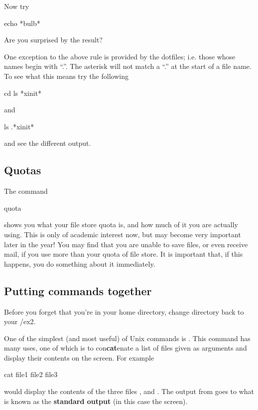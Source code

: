 Now try
%
\begin{ttoutenv}
  echo *bulb*\return
\end{ttoutenv}
%
Are you surprised by the result?

One exception to the above rule is provided by the dotfiles; i.e. those
whose names begin with ``.''. The asterisk will not match a
``.'' at the start of a file name. To see what this means try the
following
\begin{ttoutenv}
  cd \return 
  ls *xinit* \return
\end{ttoutenv}
%
and
%
\begin{ttoutenv}
  ls .*xinit*\return
\end{ttoutenv}
and see the different output.

\subsection{Quotas}
The command

\begin{ttoutenv}
  quota\return
\end{ttoutenv}

shows you what your file store quota is, and how much of it you are
actually using. This is only of academic interest now, but may become
very important later in the year! You may find that you are unable to
save files, or even receive mail, if you use more than your quota of
file store. It is important that, if this happens, you do something
about it immediately.

 
\subsection{Putting commands together}
Before you forget that you're in your home directory, change directory back to
your \crsname/ex2.

One of the simplest (and most useful) of Unix commands is
. This command has many uses, one of which is to
con\textbf{cat}enate a list of files given as arguments and display
their contents on the screen. For example
\begin{ttoutenv}
cat file1 file2 file3 \return
\end{ttoutenv}
would display the contents of the three files ,
 and .
The output from  goes to what is known as the
\textbf{standard output} (in this case the screen).


